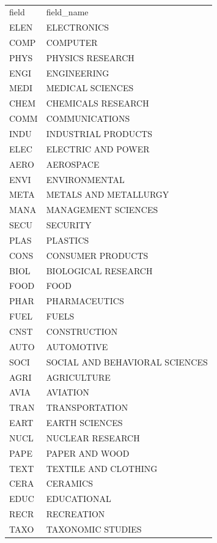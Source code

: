 \documentclass[12pt,letterpaper]{article}
\begin{document}
\begin{table}[H]
\scriptsize
\centering
\begin{tabular}{ll}
field & field\_name                    \\
ELEN  & ELECTRONICS                    \\
COMP  & COMPUTER                       \\
PHYS  & PHYSICS RESEARCH               \\
ENGI  & ENGINEERING                    \\
MEDI  & MEDICAL SCIENCES               \\
CHEM  & CHEMICALS RESEARCH             \\
COMM  & COMMUNICATIONS                 \\
INDU  & INDUSTRIAL PRODUCTS            \\
ELEC  & ELECTRIC AND POWER             \\
AERO  & AEROSPACE                      \\
ENVI  & ENVIRONMENTAL                  \\
META  & METALS AND METALLURGY          \\
MANA  & MANAGEMENT SCIENCES            \\
SECU  & SECURITY                       \\
PLAS  & PLASTICS                       \\
CONS  & CONSUMER PRODUCTS              \\
BIOL  & BIOLOGICAL RESEARCH            \\
FOOD  & FOOD                           \\
PHAR  & PHARMACEUTICS                  \\
FUEL  & FUELS                          \\
CNST  & CONSTRUCTION                   \\
AUTO  & AUTOMOTIVE                     \\
SOCI  & SOCIAL AND BEHAVIORAL SCIENCES \\
AGRI  & AGRICULTURE                    \\
AVIA  & AVIATION                       \\
TRAN  & TRANSPORTATION                 \\
EART  & EARTH SCIENCES                 \\
NUCL  & NUCLEAR RESEARCH               \\
PAPE  & PAPER AND WOOD                 \\
TEXT  & TEXTILE AND CLOTHING           \\
CERA  & CERAMICS                       \\
EDUC  & EDUCATIONAL                    \\
RECR  & RECREATION                     \\
TAXO  & TAXONOMIC STUDIES             
\end{tabular}
\caption{}
\label{tab:my-table}
\end{table}
\end{document}
